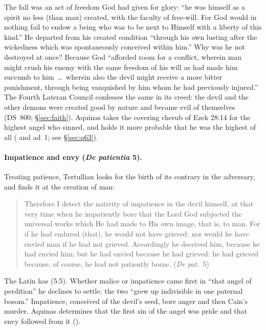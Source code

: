 The fall was an act of freedom God had given for glory: ``he was himself
as a spirit no less (than man) created, with the faculty of free-will. For
God would in nothing fail to endow a being who was to be next to Himself
with a liberty of this kind.'' He departed from his created condition
``through his own lusting after the wickedness which was spontaneously
conceived within him.'' Why was he not destroyed at once? Because God
``afforded room for a conflict, wherein man might crush his enemy with the
same freedom of his will as had made him succumb to him~\dots\ wherein
also the devil might receive a more bitter punishment, through being
vanquished by him whom he had previously injured.'' The Fourth Lateran
Council confesses the same in its creed: the devil and the other demons
were created good by nature and became evil of themselves (DS~800;
\S\ref{sec:faith}). Aquinas takes the covering cherub of Ezek 28:14 for the
highest angel who sinned, and holds it more probable that he was the
highest of all ( and ad~1; see \S\ref{sec:q63}).

\paragraph{Impatience and envy (\emph{De patientia} 5).} Treating patience,
Tertullian looks for the birth of its contrary in the adversary, and finds
it at the creation of man:
\begin{quote}
Therefore I detect the nativity of impatience in the devil himself, at
that very time when he impatiently bore that the Lord God subjected the
universal works which He had made to His own image, that is, to man. For
if he had endured (that), he would not have grieved; nor would he have
envied man if he had not grieved. Accordingly he deceived him, because he
had envied him; but he had envied because he had grieved: he had grieved
because, of course, he had not patiently borne. (\emph{De pat.}\ 5)
\end{quote}
\noindent The Latin has  (5.5). Whether malice or impatience came first in ``that
angel of perdition'' he declines to settle: the two ``grew up indivisible
in one paternal bosom.'' Impatience, conceived of the devil's seed, bore
anger and then Cain's murder. Aquinas determines that the first sin of the
angel was pride and that envy followed from it ().

